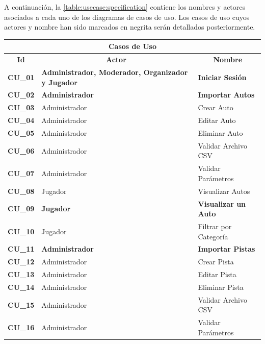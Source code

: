 A continuación, la \autoref{table:usecase:specification} contiene los nombres y actores asociados a cada uno de los diagramas de casos de uso. Los casos de uso cuyos actores y nombre han sido marcados en negrita serán detallados posteriormente.

\begin{center}
  \begin{tabular}{| p{1.5cm} | p{6.5cm} | p{5.5cm} |}
    \hline
    \multicolumn{3}{|c|}{\textbf{Casos de Uso}} \\
    \hline
    \multicolumn{1}{|c|}{\textbf{Id}} & \multicolumn{1}{|c|}{\textbf{Actor}} & \multicolumn{1}{|c|}{\textbf{Nombre}}\\
    \hline
    
    {\textbf{CU\_01}} & \textbf{Administrador, Moderador, Organizador y Jugador} & \textbf{Iniciar Sesión}\\ \hline
    
    {\textbf{CU\_02}} & \textbf{Administrador} & \textbf{Importar Autos}\\ \hline
    {\textbf{CU\_03}} & Administrador & Crear Auto\\ \hline
    {\textbf{CU\_04}} & Administrador & Editar Auto \\\hline
    {\textbf{CU\_05}} & Administrador & Eliminar Auto\\ \hline
    {\textbf{CU\_06}} & Administrador & Validar Archivo CSV\\ \hline
    {\textbf{CU\_07}} & Administrador & Validar Parámetros\\ \hline
    
    {\textbf{CU\_08}} & Jugador & Visualizar Autos\\ \hline
    {\textbf{CU\_09}} & \textbf{Jugador} & \textbf{Visualizar un Auto}\\ \hline
    {\textbf{CU\_10}} & Jugador & Filtrar por Categoría\\ \hline
    
    {\textbf{CU\_11}} & \textbf{Administrador} & \textbf{Importar Pistas}\\ \hline
    {\textbf{CU\_12}} & Administrador & Crear Pista\\ \hline
    {\textbf{CU\_13}} & Administrador & Editar Pista\\\hline
    {\textbf{CU\_14}} & Administrador & Eliminar Pista\\ \hline
    {\textbf{CU\_15}} & Administrador & Validar Archivo CSV\\ \hline
    {\textbf{CU\_16}} & Administrador & Validar Parámetros\\ \hline
    

\end{tabular}
\end{center}
